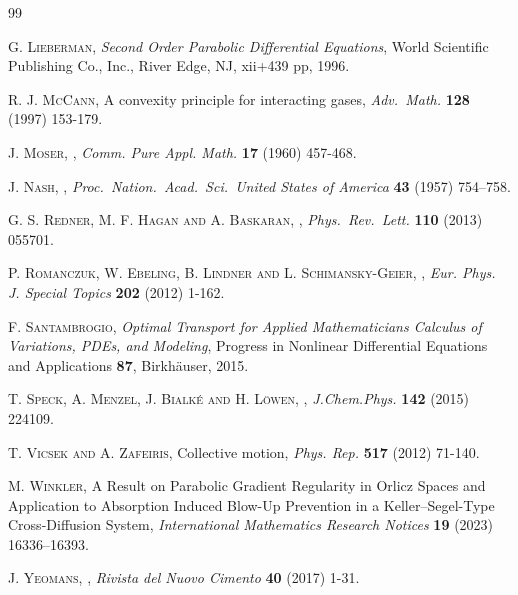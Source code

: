 \documentclass[11pt,a4paper,reqno]{amsart}
\theoremstyle{remark}
\theoremstyle{definition}
\numberwithin{equation}{section}
\begin{document}
\begin{thebibliography}{99}
\begin{footnotesize}
\newblock \textsc{G. Lieberman},
\newblock \textit{Second Order Parabolic Differential Equations}, 
\newblock World Scientific Publishing Co., Inc., River Edge, NJ, xii+439 pp, 1996. 




\newblock \textsc{R. J. McCann},
\newblock A convexity principle for interacting gases, 
\newblock \textit{Adv.~Math.} \textbf{128} (1997) 153-179.

\newblock \textsc{J. Moser},
, 
\newblock \textit{Comm. Pure Appl. Math.} \textbf{17} (1960) {457-468}.

\newblock \textsc{J. Nash},
, 
\newblock \textit{Proc.~Nation.~Acad.~Sci.~United States of America} \textbf{43} (1957) {754–758}.





\newblock \textsc{G. S. Redner, M. F. Hagan and A. Baskaran}, 
, 
\newblock \textit{Phys.~Rev.~Lett.} \textbf{110} (2013) 055701. 


\newblock \textsc{P. Romanczuk, W. Ebeling, B. Lindner and L. Schimansky-Geier},
, 
\newblock \textit{Eur. Phys. J. Special Topics} \textbf{202} (2012) 1-162. 

\newblock \textsc{F. Santambrogio},
\newblock \textit{Optimal Transport for Applied Mathematicians
Calculus of Variations, PDEs, and Modeling}, 
\newblock Progress in Nonlinear Differential Equations and Applications \textbf{87}, Birkh\"auser, 2015. 

\newblock \textsc{T. Speck, A. Menzel, J. Bialk{\'e} and H. L{\"o}wen},
, 
\newblock \textit{J.Chem.Phys.} \textbf{142} (2015) {224109}.






\newblock \textsc{T. Vicsek and A. Zafeiris},
\newblock Collective motion, 
\newblock \textit{Phys. Rep.} \textbf{517} (2012) 71-140.

\newblock\textsc{M. Winkler}, 
\newblock A Result on Parabolic Gradient Regularity in Orlicz Spaces and Application to Absorption Induced Blow-Up Prevention in a Keller–Segel-Type Cross-Diffusion System, 
\newblock \textit{International Mathematics Research Notices} \textbf{19} (2023) 16336–16393.


\newblock \textsc{J. Yeomans}, 
, 
\newblock \textit{Rivista del Nuovo Cimento} \textbf{40} (2017) 1-31.

\end{footnotesize}
    
\end{thebibliography}


    
\end{document}
